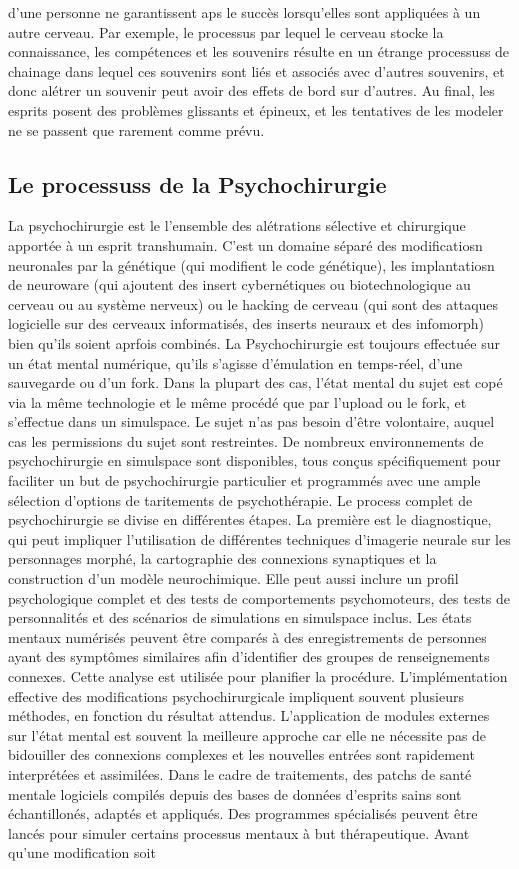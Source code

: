 d'une personne ne garantissent aps le succès lorsqu'elles sont appliquées à un autre cerveau. Par exemple, le processus par lequel le cerveau stocke la connaissance, les compétences et les souvenirs résulte en un étrange processuss de chainage dans lequel ces souvenirs sont liés et associés avec d'autres souvenirs, et donc alétrer un souvenir peut avoir des effets de bord sur d'autres. Au final, les esprits posent des problèmes glissants et épineux, et les tentatives de les modeler ne se passent que rarement comme prévu. 

\subsection{Le processuss de la Psychochirurgie} La psychochirurgie est le l'ensemble des alétrations sélective et chirurgique apportée à un esprit transhumain. C'est un domaine séparé des modificatiosn neuronales par la génétique (qui modifient le code génétique), les implantatiosn de neuroware (qui ajoutent des insert cybernétiques ou biotechnologique au cerveau ou au système nerveux) ou le hacking de cerveau (qui sont des attaques logicielle sur des cerveaux informatisés, des inserts neuraux et des infomorph) bien qu'ils soient aprfois combinés. La Psychochirurgie est toujours effectuée sur un état mental numérique, qu'ils s'agisse d'émulation en temps-réel, d'une sauvegarde ou d'un fork. Dans la plupart des cas, l'état mental du sujet est copé via la même technologie et le même procédé que par l'upload ou le fork, et s'effectue dans un simulspace. Le sujet n'as pas besoin d'être volontaire, auquel cas les permissions du sujet sont restreintes. De nombreux environnements de psychochirurgie en simulspace sont disponibles, tous conçus spécifiquement pour faciliter un but de psychochirurgie particulier et programmés avec une ample sélection d'options de taritements de psychothérapie. Le process complet de psychochirurgie se divise en différentes étapes. La première est le diagnostique, qui peut impliquer l'utilisation de différentes techniques d'imagerie neurale sur les personnages morphé, la cartographie des connexions synaptiques et la construction d'un modèle neurochimique. Elle peut aussi inclure un profil psychologique complet et des tests de comportements psychomoteurs, des tests de personnalités et des scénarios de simulations en simulspace inclus. Les états mentaux numérisés peuvent être comparés à des enregistrements de personnes ayant des symptômes similaires afin d'identifier des groupes de renseignements connexes. Cette analyse est utilisée pour planifier la procédure. L'implémentation effective des modifications psychochirurgicale impliquent souvent plusieurs méthodes, en fonction du résultat attendus. L'application de modules externes sur l'état mental est souvent la meilleure approche car elle ne nécessite pas de bidouiller des connexions complexes et les nouvelles entrées sont rapidement interprétées et assimilées. Dans le cadre de traitements, des patchs de santé mentale logiciels compilés depuis des bases de données d'esprits sains sont échantillonés, adaptés et appliqués. Des programmes spécialisés peuvent être lancés pour simuler certains processus mentaux à but thérapeutique. Avant qu'une modification soit 